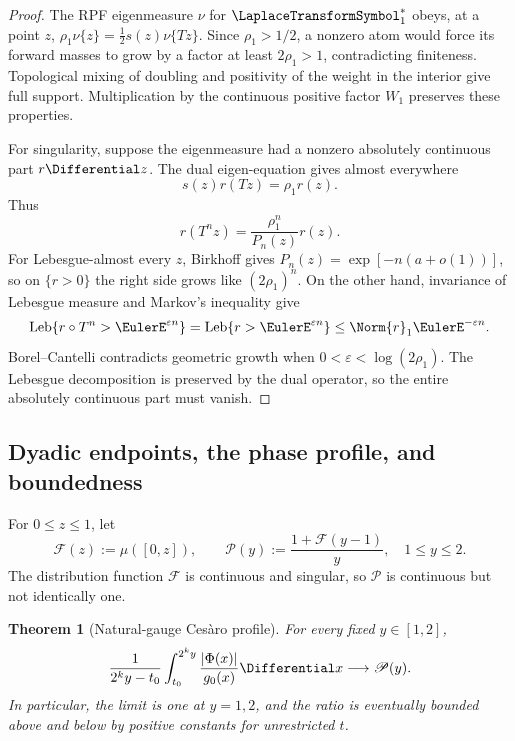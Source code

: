 \documentclass[11pt]{article}
\newtheorem{theorem}{Theorem}[section]
\theoremstyle{definition}
\theoremstyle{remark}
\newcommand{\Leb}{\operatorname{Leb}}
\newcommand{\T}{T}
\begin{document}
\begin{proof}
The RPF eigenmeasure \(\nu\) for \(\LaplaceTransformSymbol_1^*\) obeys, at a point \(z\),
\(
 \rho_1\nu\{z\}=\tfrac12s(z)\nu\{\T z\}\).  Since
\(\rho_1>1/2\), a nonzero atom would force its forward masses to grow by a
factor at least \(2\rho_1>1\), contradicting finiteness.  Topological mixing
of doubling and positivity of the weight in the interior give full support.
Multiplication by the continuous positive factor \(W_1\) preserves these
properties.

For singularity, suppose the eigenmeasure had a nonzero absolutely continuous
part \(r\Differential z\).  The dual eigen-equation gives almost everywhere
\begin{equation}
 s(z)r(\T z)=\rho_1r(z).
 \label{eq:conformal-density}
\end{equation}
Thus
\begin{equation}
 r(\T^nz)=\frac{\rho_1^n}{P_n(z)}r(z).
 \label{eq:density-iterate}
\end{equation}
For Lebesgue-almost every \(z\), Birkhoff gives
\(P_n(z)=\exp[-n(a+o(1))]\), so on \(\{r>0\}\) the right side grows like
\((2\rho_1)^n\).  On the other hand, invariance of Lebesgue measure and
Markov's inequality give
\[
 \Leb\{r\circ\T^n>\EulerE^{\varepsilon n}\}
 =\Leb\{r>\EulerE^{\varepsilon n}\}
 \le\Norm{r}_1\EulerE^{-\varepsilon n}.
\]
Borel--Cantelli contradicts geometric growth when
\(0<\varepsilon<\log(2\rho_1)\).  The Lebesgue decomposition is preserved by
the dual operator, so the entire absolutely continuous part must vanish.
\end{proof}

\subsection{Dyadic endpoints, the phase profile, and boundedness}

For \(0\le z\le1\), let
\begin{equation}
 \mathscr F(z):=\mu([0,z]),
 \qquad
 \mathscr P(y):=\frac{1+\mathscr F(y-1)}{y},
 \quad 1\le y\le2.
 \label{eq:profile}
\end{equation}
The distribution function \(\mathscr F\) is continuous and singular, so
\(\mathscr P\) is continuous but not identically one.

\begin{theorem}[Natural-gauge Ces\`aro profile]
\label{thm:natural-profile}
For every fixed \(y\in[1,2]\),
\begin{equation}
 \frac1{2^ky-t_0}\int_{t_0}^{2^ky}
 \frac{|\Phi(x)|}{g_0(x)}\Differential x
 \longrightarrow\mathscr P(y).
 \label{eq:profile-limit}
\end{equation}
In particular, the limit is one at \(y=1,2\), and the ratio is eventually
bounded above and below by positive constants for unrestricted \(t\).
\end{theorem}
\end{document}
